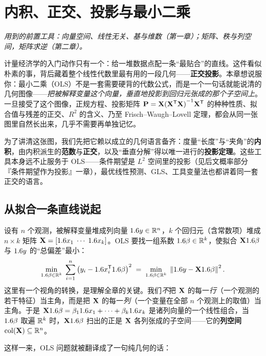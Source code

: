 \chapter{内积、正交、投影与最小二乘}
\label{ch:proj}

\noindent\emph{用到的前置工具：向量空间、线性无关、基与维数（第一章）；矩阵、秩与列空间，矩阵求逆（第二章）。}
\medskip

计量经济学的入门动作只有一个：给一堆数据点配一条``最贴合''的直线。这件看似朴素的事，背后藏着整个线性代数里最有用的一段几何——\textbf{正交投影}。本章想说服你：最小二乘（OLS）不是一套需要硬背的代数公式，而是一个一句话就能说清的几何图像——\emph{把被解释变量这个向量，垂直地投影到回归元张成的那个子空间上}。一旦接受了这个图像，正规方程、投影矩阵 $\mathbf{P}=\mathbf{X}{(\mathbf{X}^{\mathsf{T}}\mathbf{X})}^{-1}\mathbf{X}^{\mathsf{T}}$ 的种种性质、拟合值与残差的正交、$R^2$ 的含义、乃至 Frisch–Waugh–Lovell 定理，都会从同一张图里自然长出来，几乎不需要再单独记忆。

为了讲清这张图，我们先把它赖以成立的几何语言备齐：度量``长度''与``夹角''的\textbf{内积}，由内积派生的\textbf{范数}与\textbf{正交}，以及``垂直分解''得以唯一进行的\textbf{投影定理}。这些工具本身远不止服务于 OLS——条件期望是 $L^2$ 空间里的投影（见后文概率部分『条件期望作为投影』一章），最优线性预测、GLS、工具变量法也都讲着同一套正交的语言。

\section{从拟合一条直线说起}
\label{sec:proj-motivation}

设有 $n$ 个观测，被解释变量堆成列向量 $1.6 y\in\mathbb{R}^{n}$，$k$ 个回归元（含常数项）堆成 $n\times k$ 矩阵 $\mathbf{X}=[1.6 x_1\;\cdots\;1.6 x_k]$。OLS 要找一组系数 $1.6\beta\in\mathbb{R}^{k}$，使拟合 $\mathbf{X}1.6\beta$ 与 $1.6 y$ 的``总偏差''最小：
\[
    \min_{1.6\beta\in\mathbb{R}^{k}}\;\sum_{i=1}^{n}\left(y_i-1.6 x_i^{\mathsf{T}}1.6\beta\right)^2
    \;=\;\min_{1.6\beta\in\mathbb{R}^{k}}\;\left\|1.6 y-\mathbf{X}1.6\beta\right\|_{}^2 .
\]
这里有一个视角的转换，是理解全章的关键。我们\emph{不}把 $\mathbf{X}$ 的每一\emph{行}（一个观测的若干特征）当主角，而是把 $\mathbf{X}$ 的每一\emph{列}（一个变量在全部 $n$ 个观测上的取值）当主角。于是 $\mathbf{X}1.6\beta=\beta_11.6 x_1+\cdots+\beta_k1.6 x_k$ 是诸列向量的一个线性组合，当 $1.6\beta$ 取遍 $\mathbb{R}^k$ 时，$\mathbf{X}1.6\beta$ 扫出的正是 $\mathbf{X}$ 各列张成的子空间——它的\textbf{列空间} $\mathrm{col}(\mathbf{X})\subseteq\mathbb{R}^{n}$。

这样一来，OLS 问题就被翻译成了一句纯几何的话：


